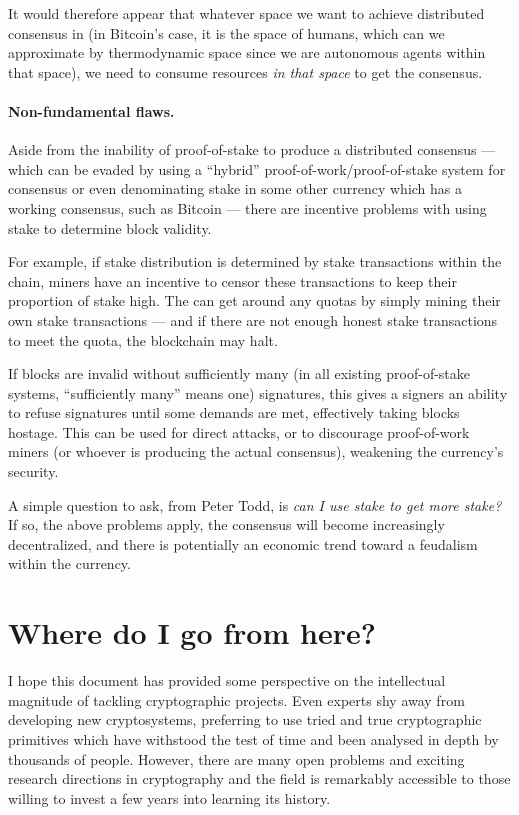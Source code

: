 \documentclass[letterpaper]{article}
\begin{document}
It would therefore appear that whatever space we want to achieve distributed
consensus in (in Bitcoin's case, it is the space of humans, which can we approximate
by thermodynamic space since we are autonomous agents within that space), we
need to consume resources \emph{in that space} to get the consensus.

\paragraph{Non-fundamental flaws.} Aside from the inability of proof-of-stake
to produce a distributed consensus --- which can be evaded by using a ``hybrid''
proof-of-work/proof-of-stake system for consensus or even denominating stake
in some other currency which has a working consensus, such as Bitcoin --- there
are incentive problems with using stake to determine block validity.

For example, if stake distribution is determined by stake transactions within
the chain, miners have an incentive to censor these transactions to keep their
proportion of stake high. The can get around any quotas by simply mining their
own stake transactions --- and if there are not enough honest stake transactions
to meet the quota, the blockchain may halt.

If blocks are invalid without sufficiently many (in all existing proof-of-stake
systems, ``sufficiently many'' means one) signatures, this gives a signers an
ability to refuse signatures until some demands are met, effectively taking
blocks hostage. This can be used for direct attacks, or to discourage proof-of-work
miners (or whoever is producing the actual consensus), weakening the currency's
security.

A simple question to ask, from Peter Todd, is \emph{can I use stake to get more
stake?} If so, the above problems apply, the consensus will become increasingly
decentralized, and there is potentially an economic trend toward a feudalism
within the currency.


\section{Where do I go from here?}

I hope this document has provided some perspective on the intellectual
magnitude of tackling cryptographic projects. Even experts shy away from
developing new cryptosystems, preferring to use tried and true cryptographic
primitives which have withstood the test of time and been analysed in depth
by thousands of people. However, there are many open problems and exciting
research directions in cryptography and the field is remarkably accessible
to those willing to invest a few years into learning its history.
\end{document}
